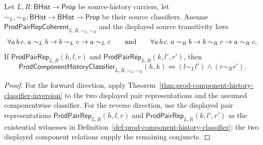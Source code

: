 \begin{theorem}
\label{thm:prod-component-history-classifier-displayed-exactness}
Let $L,R:\mathsf{BHist}\to\mathsf{Prop}$ be source-history carriers, let
$\sim_L,\sim_R:\mathsf{BHist}\to\mathsf{BHist}\to\mathsf{Prop}$ be their source
classifiers. Assume $\mathsf{ProdPairRepCoherent}_{L,R,\sim_L,\sim_R}$ and the
displayed source transitivity laws
$$
\forall a\,b\,c.\;a\sim_L b\to b\sim_L c\to a\sim_L c
\qquad\hbox{and}\qquad
\forall a\,b\,c.\;a\sim_R b\to b\sim_R c\to a\sim_R c.
$$
If
$\mathsf{ProdPairRep}_{L,R}(h,l,r)$ and
$\mathsf{ProdPairRep}_{L,R}(k,l',r')$, then
$$
\mathsf{ProdComponentHistoryClassifier}_{L,R,\sim_L,\sim_R}(h,k)
\Longleftrightarrow
(l\sim_L l')\wedge(r\sim_R r').
$$
\end{theorem}
\begin{proof}
For the forward direction, apply
Theorem~\ref{thm:prod-component-history-classifier-inversion} to the two
displayed pair representations and the assumed componentwise classifier. For
the reverse direction, use the displayed pair representations
$\mathsf{ProdPairRep}_{L,R}(h,l,r)$ and
$\mathsf{ProdPairRep}_{L,R}(k,l',r')$ as the existential witnesses in
Definition~\ref{def:prod-component-history-classifier}; the two displayed
component relations supply the remaining conjuncts.
\end{proof}
